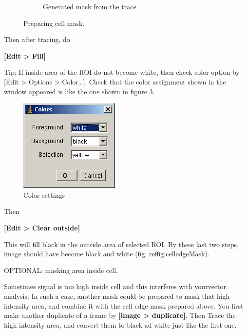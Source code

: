 \documentclass{article}
\begin{document}
\begin{figure}[!ht]
\begin{subfigure}{.5\textwidth}
  \caption{Generated mask from the trace.}
  \label{fig:celledgeMask}
\end{subfigure}
\caption{Preparing cell mask.}
\label{fig:celledgemaskCreation}
\end{figure}


Then after tracing, do

\textbf{{[}Edit \textgreater{} Fill{]}}

Tip: If inside area of the ROI do not become white, then check color
option by {[}Edit \textgreater{} Options \textgreater{}
Color\ldots{}{]}. Check that the color assignment shown in the window
appeared is like the one shown in figure \ref{fig:colorsettings}.

\begin{figure}[!ht]
\centering
\includegraphics[scale=0.7]{img/image065.png}
\caption{Color settings}
\label{fig:colorsettings}
\end{figure}

Then

\textbf{{[}Edit \textgreater{} Clear outside{]}}

This will fill black in the outside area of selected ROI. By these last
two steps, image should have become black and white (fig. ref{fig:celledgeMask}).

OPTIONAL: masking area inside cell.

Sometimes signal is too high inside cell and this interferes with
yourvector analysis. In such a case, another mask could be prepared to
mask that high-intensity area, and combine it with the cell edge mask
prepared above. You first make another duplicate of a frame by
\textbf{{[}image \textgreater{} duplicate{]}}. Then Trace the high
intensity area, and convert them to black ad white just like the first
one.

\end{document}
